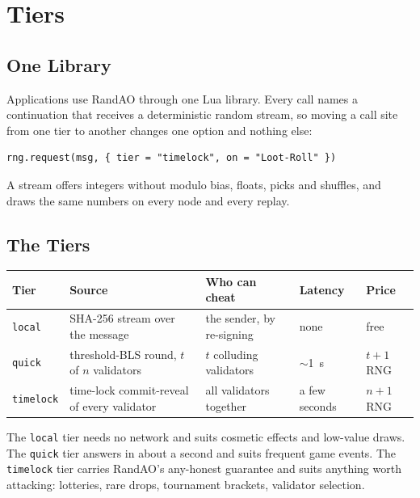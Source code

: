 \section{Tiers}\label{sec:tiers}

\subsection{One Library}\label{sec:library}
Applications use RandAO through one Lua library. Every call names a continuation that receives a deterministic random stream, so moving a call site from one tier to another changes one option and nothing else:
\begin{verbatim}
rng.request(msg, { tier = "timelock", on = "Loot-Roll" })
\end{verbatim}
A stream offers integers without modulo bias, floats, picks and shuffles, and draws the same numbers on every node and every replay.

\subsection{The Tiers}\label{sec:tier_table}

\begin{center}
\begin{tabular}{p{2.2cm} p{4.2cm} p{3.6cm} p{1.8cm} p{1.4cm}}
\textbf{Tier} & \textbf{Source} & \textbf{Who can cheat} & \textbf{Latency} & \textbf{Price} \\
\hline
\texttt{local} & SHA-256 stream over the message & the sender, by re-signing & none & free \\
\texttt{quick} & threshold-BLS round, $t$ of $n$ validators & $t$ colluding validators & $\sim$1~s & $t+1$ RNG \\
\texttt{timelock} & time-lock commit-reveal of every validator & all validators together & a few seconds & $n+1$ RNG \\
\end{tabular}
\end{center}

The \texttt{local} tier needs no network and suits cosmetic effects and low-value draws. The \texttt{quick} tier answers in about a second and suits frequent game events. The \texttt{timelock} tier carries RandAO's any-honest guarantee and suits anything worth attacking: lotteries, rare drops, tournament brackets, validator selection.
